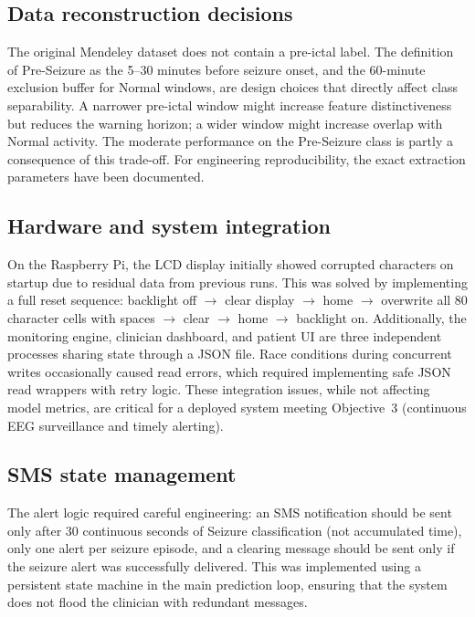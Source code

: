 \documentclass[12pt, a4paper]{report}
\begin{document}
\subsection*{Data reconstruction decisions}

The original Mendeley dataset does not contain a pre-ictal label. The
definition of Pre-Seizure as the 5--30 minutes before seizure onset, and
the 60-minute exclusion buffer for Normal windows, are design choices that
directly affect class separability. A narrower pre-ictal window might
increase feature distinctiveness but reduces the warning horizon; a wider
window might increase overlap with Normal activity. The moderate
performance on the Pre-Seizure class is partly a consequence of this
trade-off. For engineering reproducibility, the exact extraction parameters
have been documented.

\subsection*{Hardware and system integration}

On the Raspberry Pi, the LCD display initially showed corrupted characters
on startup due to residual data from previous runs. This was solved by
implementing a full reset sequence: backlight off $\to$ clear display $\to$
home $\to$ overwrite all 80 character cells with spaces $\to$ clear $\to$
home $\to$ backlight on. Additionally, the monitoring engine, clinician
dashboard, and patient UI are three independent processes sharing state
through a JSON file. Race conditions during concurrent writes occasionally
caused read errors, which required implementing safe JSON read wrappers
with retry logic. These integration issues, while not affecting model
metrics, are critical for a deployed system meeting Objective~3 (continuous
EEG surveillance and timely alerting).

\subsection*{SMS state management}

The alert logic required careful engineering: an SMS notification should
be sent only after 30 continuous seconds of Seizure classification (not
accumulated time), only one alert per seizure episode, and a clearing
message should be sent only if the seizure alert was successfully
delivered. This was implemented using a persistent state machine in the
main prediction loop, ensuring that the system does not flood the
clinician with redundant messages.
\end{document}
